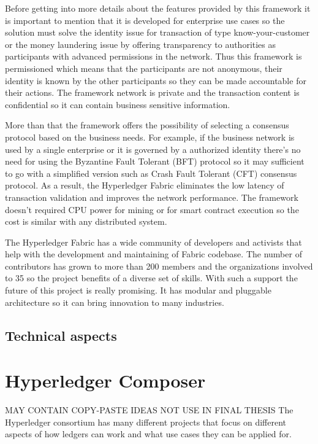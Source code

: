 Before getting into more details about the features provided by this framework it is important to mention that it is developed for enterprise use cases so the solution must solve the identity issue for transaction of type know-your-customer or the money laundering issue by offering transparency to authorities as participants with advanced permissions in the network. Thus this framework is permissioned which means that the participants are not anonymous, their identity is known by the other participants so they can be made accountable for their actions. The framework network is private and the transaction content is confidential so it can contain business sensitive information.

More than that the framework offers the  possibility of selecting a consensus protocol based on the business needs. For example, if the business network is used by a single enterprise or it is governed by a authorized identity there's no need for using the Byzantine Fault Tolerant (BFT) protocol so it may sufficient to go with a simplified version such as Crash Fault Tolerant (CFT) consensus protocol. As a result, the Hyperledger Fabric eliminates the low latency of transaction validation and  improves the network performance. The framework doesn't required CPU power for mining or for smart contract execution so the cost is similar with any distributed system.

The Hyperledger Fabric has a wide community of developers and activists that help with the development and maintaining of Fabric codebase. The number of contributors has grown to more than 200 members and the organizations involved to 35 so the project benefits of a diverse set of skills. With such a support the future of this project is really promising. It has modular and pluggable architecture so it can bring innovation to many industries.

\subsection{Technical aspects}
\label{sub-sec:chapter1-subsection2}



\section{Hyperledger Composer}
\label{sub-sec:chapter1-section3}

\iffalse
MAY CONTAIN COPY-PASTE IDEAS
NOT USE IN FINAL THESIS
The Hyperledger consortium has many different projects that focus on different aspects of how ledgers can work and what use cases they can be applied for.

